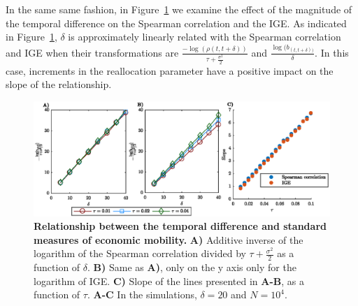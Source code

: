\documentclass[11pt]{article}
\newcommand{\Fref}[1]{Figure~\ref{fig:#1}}
\numberwithin{equation}{section}
\begin{document}
In the same same fashion, in \Fref{rgbm-standard-measures-delta} we examine the effect of the magnitude of the temporal difference on the Spearman correlation and the IGE. As indicated in \Fref{rgbm-standard-measures-delta}, $\delta$ is approximately linearly related with the Spearman correlation and IGE when their transformations are $\frac{-\log(\rho(t,t+\delta))}{\tau + \frac{\sigma^2}{2}}$ and $\frac{\log(b_{(t,t+\delta))}}{\delta}$. In this case, increments in the reallocation parameter have a positive impact on the slope of the relationship.

\begin{figure}[!htb]
\centering
\includegraphics[width=1.0\textwidth]{figs/fig_rgbm_delta_relationship.eps}
\caption{\textbf{Relationship between the temporal difference and standard measures of economic mobility.} \textbf{A)} Additive inverse of the logarithm of the Spearman correlation divided by $\tau +\frac{\sigma^2}{2}$ as a function of $\delta$. \textbf{B)} Same as \textbf{A)}, only on the y axis only for the logarithm of IGE. \textbf{C)} Slope of the lines presented in \textbf{A-B}, as a function of $\tau$. 
\textbf{A-C} In the simulations, $\delta = 20$ and $N = 10^4$.
\label{fig:rgbm-standard-measures-delta}}
\end{figure}
\FloatBarrier
\end{document}
